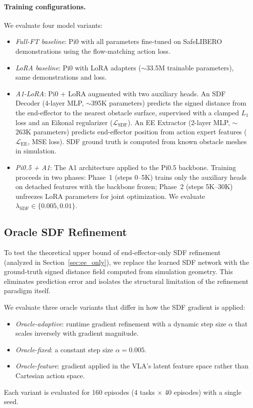 \paragraph{Training configurations.} We evaluate four model variants:
\begin{itemize}
\item \textit{Full-FT baseline}: Pi0 with all parameters fine-tuned on SafeLIBERO demonstrations using the flow-matching action loss.
\item \textit{LoRA baseline}: Pi0 with LoRA adapters (${\sim}$33.5M trainable parameters), same demonstrations and loss.
\item \textit{A1-LoRA}: Pi0 + LoRA augmented with two auxiliary heads. An SDF Decoder (4-layer MLP, ${\sim}$395K parameters) predicts the signed distance from the end-effector to the nearest obstacle surface, supervised with a clamped $L_1$ loss and an Eikonal regularizer ($\mathcal{L}_\text{SDF}$). An EE Extractor (2-layer MLP, ${\sim}$263K parameters) predicts end-effector position from action expert features ($\mathcal{L}_\text{EE}$, MSE loss). SDF ground truth is computed from known obstacle meshes in simulation.
\item \textit{Pi0.5 + A1}: The A1 architecture applied to the Pi0.5 backbone. Training proceeds in two phases: Phase~1 (steps 0--5K) trains only the auxiliary heads on detached features with the backbone frozen; Phase~2 (steps 5K--30K) unfreezes LoRA parameters for joint optimization. We evaluate $\lambda_\text{SDF} \in \{0.005, 0.01\}$.
\end{itemize}

\subsection{Oracle SDF Refinement}

To test the theoretical upper bound of end-effector-only SDF refinement (analyzed in Section~\ref{sec:ee_only}), we replace the learned SDF network with the ground-truth signed distance field computed from simulation geometry. This eliminates prediction error and isolates the structural limitation of the refinement paradigm itself.

We evaluate three oracle variants that differ in how the SDF gradient is applied:
\begin{itemize}
\item \textit{Oracle-adaptive}: runtime gradient refinement with a dynamic step size $\alpha$ that scales inversely with gradient magnitude.
\item \textit{Oracle-fixed}: a constant step size $\alpha = 0.005$.
\item \textit{Oracle-feature}: gradient applied in the VLA's latent feature space rather than Cartesian action space.
\end{itemize}
Each variant is evaluated for 160 episodes (4 tasks $\times$ 40 episodes) with a single seed.

